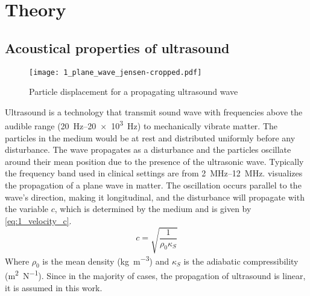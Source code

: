 \chapter{Theory} \label{sec:theory}
\section{Acoustical properties of ultrasound}

\begin{figure}[ht]
	\centering
	\texttt{[image: 1\_plane\_wave\_jensen-cropped.pdf]}
	\caption{Particle displacement for a propagating ultrasound wave \cite{JensenUltrasoundBook}}
	\label{fig:1_planewave_jensen}
\end{figure}

Ultrasound is a technology that transmit sound wave with frequencies above the audible range (\qtyrange[range-units = single]{20}{20e3}{\hertz}) to mechanically vibrate matter. The particles in the medium would be at rest and distributed uniformly before any disturbance. The wave propagates as a disturbance and the particles oscillate around their mean position due to the presence of the ultrasonic wave. Typically the  frequency band used in clinical settings are from \qtyrange[range-units = single]{2}{12}{\mega\hertz}.  visualizes the propagation of a plane wave in matter. The oscillation occurs parallel to the wave's direction, making it longitudinal, and the disturbance will propagate with the variable $c$, which is determined by the medium and is given by \cref{eq:1_velocity_c}.
\begin{equation} \label{eq:1_velocity_c}
	c = \sqrt{\frac{1}{\rho_{0} \kappa_{S}}}
\end{equation}
Where $\rho_{0}$ is the mean density (\si{\kilogram\per\meter\cubed}) and $\kappa_{S}$ is the \gls{adiabatic} compressibility (\si{\meter\squared\per\newton}). Since in the majority of cases, the propagation of ultrasound is linear, it is assumed in this work. 

